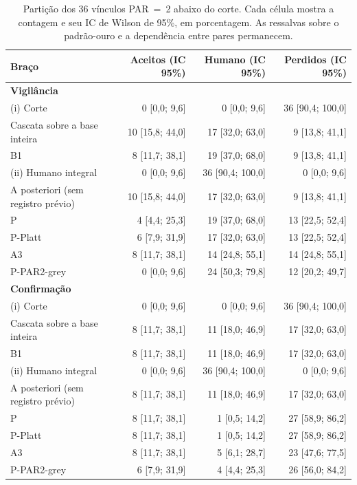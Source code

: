 \begin{longtable}{lrrr}
\caption{Partição dos 36 vínculos PAR~=~2 abaixo do corte. Cada célula mostra a contagem e seu IC de Wilson de 95\%, em porcentagem. As ressalvas sobre o padrão-ouro e a dependência entre pares permanecem.}
\label{tab:cap8-arranjo-corte-par2}\\
\toprule
Braço & Aceitos (IC 95\%) & Humano (IC 95\%) & Perdidos (IC 95\%) \\
\midrule
\multicolumn{4}{l}{\textbf{Vigilância}} \\
(i) Corte & 0 [0,0; 9,6] & 0 [0,0; 9,6] & 36 [90,4; 100,0] \\
Cascata sobre a base inteira & 10 [15,8; 44,0] & 17 [32,0; 63,0] & 9 [13,8; 41,1] \\
B1 & 8 [11,7; 38,1] & 19 [37,0; 68,0] & 9 [13,8; 41,1] \\
(ii) Humano integral & 0 [0,0; 9,6] & 36 [90,4; 100,0] & 0 [0,0; 9,6] \\
A posteriori (sem registro prévio) & 10 [15,8; 44,0] & 17 [32,0; 63,0] & 9 [13,8; 41,1] \\
P & 4 [4,4; 25,3] & 19 [37,0; 68,0] & 13 [22,5; 52,4] \\
P-Platt & 6 [7,9; 31,9] & 17 [32,0; 63,0] & 13 [22,5; 52,4] \\
A3 & 8 [11,7; 38,1] & 14 [24,8; 55,1] & 14 [24,8; 55,1] \\
P-PAR2-grey & 0 [0,0; 9,6] & 24 [50,3; 79,8] & 12 [20,2; 49,7] \\
\midrule
\multicolumn{4}{l}{\textbf{Confirmação}} \\
(i) Corte & 0 [0,0; 9,6] & 0 [0,0; 9,6] & 36 [90,4; 100,0] \\
Cascata sobre a base inteira & 8 [11,7; 38,1] & 11 [18,0; 46,9] & 17 [32,0; 63,0] \\
B1 & 8 [11,7; 38,1] & 11 [18,0; 46,9] & 17 [32,0; 63,0] \\
(ii) Humano integral & 0 [0,0; 9,6] & 36 [90,4; 100,0] & 0 [0,0; 9,6] \\
A posteriori (sem registro prévio) & 8 [11,7; 38,1] & 11 [18,0; 46,9] & 17 [32,0; 63,0] \\
P & 8 [11,7; 38,1] & 1 [0,5; 14,2] & 27 [58,9; 86,2] \\
P-Platt & 8 [11,7; 38,1] & 1 [0,5; 14,2] & 27 [58,9; 86,2] \\
A3 & 8 [11,7; 38,1] & 5 [6,1; 28,7] & 23 [47,6; 77,5] \\
P-PAR2-grey & 6 [7,9; 31,9] & 4 [4,4; 25,3] & 26 [56,0; 84,2] \\
\bottomrule
\end{longtable}
\endgroup
